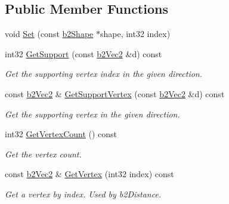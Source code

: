 \subsection*{Public Member Functions}
\begin{DoxyCompactItemize}
\item 
void \hyperlink{structb2DistanceProxy_a80a59a9c9e952482a8fc6db4b883365d}{Set} (const \hyperlink{classb2Shape}{b2\+Shape} $\ast$shape, int32 index)
\item 
\mbox{\label{structb2DistanceProxy_a39de286cc0c1e829adfacfa0061b04f2}} 
int32 \hyperlink{structb2DistanceProxy_a39de286cc0c1e829adfacfa0061b04f2}{Get\+Support} (const \hyperlink{structb2Vec2}{b2\+Vec2} \&d) const
\begin{DoxyCompactList}\small\item\em Get the supporting vertex index in the given direction. \end{DoxyCompactList}\item 
\mbox{\label{structb2DistanceProxy_a245993f09e9f3d3f374bb95041acf822}} 
const \hyperlink{structb2Vec2}{b2\+Vec2} \& \hyperlink{structb2DistanceProxy_a245993f09e9f3d3f374bb95041acf822}{Get\+Support\+Vertex} (const \hyperlink{structb2Vec2}{b2\+Vec2} \&d) const
\begin{DoxyCompactList}\small\item\em Get the supporting vertex in the given direction. \end{DoxyCompactList}\item 
\mbox{\label{structb2DistanceProxy_a99c461f28d484429dac8f14b58f63d89}} 
int32 \hyperlink{structb2DistanceProxy_a99c461f28d484429dac8f14b58f63d89}{Get\+Vertex\+Count} () const
\begin{DoxyCompactList}\small\item\em Get the vertex count. \end{DoxyCompactList}\item 
\mbox{\label{structb2DistanceProxy_a9073b2c680d3fee6399f15be79ad144a}} 
const \hyperlink{structb2Vec2}{b2\+Vec2} \& \hyperlink{structb2DistanceProxy_a9073b2c680d3fee6399f15be79ad144a}{Get\+Vertex} (int32 index) const
\begin{DoxyCompactList}\small\item\em Get a vertex by index. Used by b2\+Distance. \end{DoxyCompactList}\item 

\end{DoxyCompactItemize}
